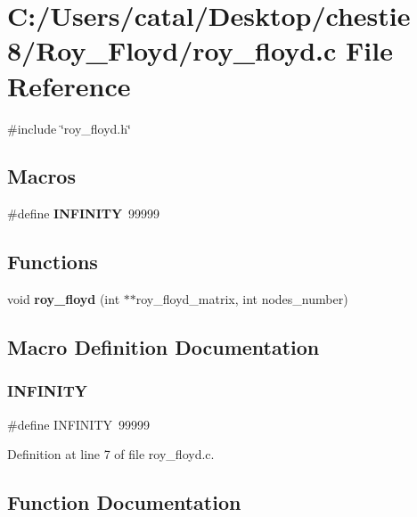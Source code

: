 \section{C\+:/\+Users/catal/\+Desktop/chestie 8/\+Roy\+\_\+\+Floyd/roy\+\_\+floyd.c File Reference}
\label{roy__floyd_8c}
{\ttfamily \#include \char`\"{}roy\+\_\+floyd.\+h\char`\"{}}\newline
\subsection*{Macros}
\begin{DoxyCompactItemize}
\item 
\#define \textbf{ I\+N\+F\+I\+N\+I\+TY}~99999
\end{DoxyCompactItemize}
\subsection*{Functions}
\begin{DoxyCompactItemize}
\item 
void \textbf{ roy\+\_\+floyd} (int $\ast$$\ast$roy\+\_\+floyd\+\_\+matrix, int nodes\+\_\+number)
\end{DoxyCompactItemize}


\subsection{Macro Definition Documentation}
\mbox{\label{roy__floyd_8c_a956e2723d559858d08644ac99146e910}} 
\subsubsection{I\+N\+F\+I\+N\+I\+TY}
{\footnotesize\ttfamily \#define I\+N\+F\+I\+N\+I\+TY~99999}



Definition at line 7 of file roy\+\_\+floyd.\+c.



\subsection{Function Documentation}
\mbox{\label{roy__floyd_8c_a0771d034a43d8d0ac1df7a3dc9b363e2}} 
